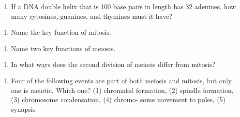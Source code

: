 \documentclass[11pt,]{article}
\providecommand{\tightlist}{%
  \setlength{\itemsep}{0pt}\setlength{\parskip}{0pt}}
\begin{document}
\begin{blackbox}

\begin{enumerate}
\def\labelenumi{\arabic{enumi}.}
\setcounter{enumi}{11}
\tightlist
\item
  If a DNA double helix that is 100 base pairs in length has 32
  adenines, how many cytosines, guanines, and thymines must it have?
\end{enumerate}

\vspace{19cm}

\end{blackbox}

\begin{blackbox}

\begin{enumerate}
\def\labelenumi{\arabic{enumi}.}
\setcounter{enumi}{17}
\tightlist
\item
  Name the key function of mitosis.
\end{enumerate}

\vspace{19cm}

\end{blackbox}

\begin{blackbox}

\begin{enumerate}
\def\labelenumi{\arabic{enumi}.}
\setcounter{enumi}{18}
\tightlist
\item
  Name two key functions of meiosis.
\end{enumerate}

\vspace{19cm}

\end{blackbox}

\begin{blackbox}

\begin{enumerate}
\def\labelenumi{\arabic{enumi}.}
\setcounter{enumi}{21}
\tightlist
\item
  In what ways does the second division of meiosis differ from mitosis?
\end{enumerate}

\vspace{19cm}

\end{blackbox}

\begin{blackbox}

\begin{enumerate}
\def\labelenumi{\arabic{enumi}.}
\setcounter{enumi}{29}
\tightlist
\item
  Four of the following events are part of both meiosis and mitosis, but
  only one is meiotic. Which one? (1) chromatid formation, (2) spindle
  formation, (3) chromosome condensation, (4) chromo- some movement to
  poles, (5) synapsis
\end{enumerate}

\vspace{19cm}

\end{blackbox}
\end{document}
